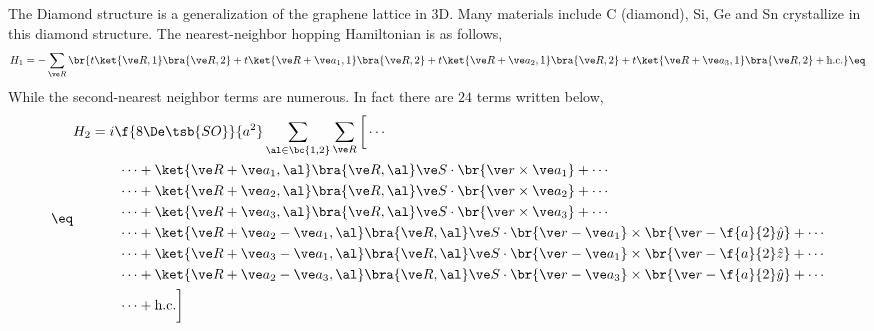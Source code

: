 \documentclass{article}
\begin{document}
The Diamond structure is a generalization of the graphene lattice in 3D. Many materials include C (diamond), Si, Ge and Sn crystallize in this diamond structure. The nearest-neighbor hopping Hamiltonian is as follows,
\[ H_1 = - \sum_{\ve R} \br{t \ket{\ve R, 1}\bra{\ve R, 2} + t \ket{\ve R + \ve a_1, 1}\bra{\ve R, 2} + t \ket{\ve R + \ve a_2, 1}\bra{\ve R, 2} + t \ket{\ve R + \ve a_3, 1} \bra{\ve R, 2} + \text{h.c.}} \eq \label{eq:diamond_H1}\]
While the second-nearest neighbor terms are numerous. In fact there are $24$ terms written below,
\begin{align*}
\eq \label{eq:diamond_H2}
\begin{split}
H_2
&= i \f{8 \De\tsb{SO}}{a^2} \sum_{\al \in \bc{1,2}}\sum_{\ve R} \bigg[\cdots \\
&\qquad \cdots + \ket{\ve R + \ve a_1,\al} \bra{\ve R, \al} \ve S \cdot \br{\ve r \times \ve a_1} + \cdots \\
&\qquad \cdots + \ket{\ve R + \ve a_2,\al} \bra{\ve R, \al} \ve S \cdot \br{\ve r \times \ve a_2} + \cdots \\
&\qquad \cdots + \ket{\ve R + \ve a_3,\al} \bra{\ve R, \al} \ve S \cdot \br{\ve r \times \ve a_3} + \cdots \\
&\qquad \cdots + \ket{\ve R + \ve a_2 - \ve a_1,\al} \bra{\ve R, \al} \ve S \cdot \br{\ve r - \ve a_1} \times \br{\ve r -\f{a}{2} \hat y} + \cdots \\
&\qquad \cdots + \ket{\ve R + \ve a_3 - \ve a_1,\al} \bra{\ve R, \al} \ve S \cdot \br{\ve r - \ve a_1} \times \br{\ve r -\f{a}{2} \hat z} + \cdots \\
&\qquad \cdots + \ket{\ve R + \ve a_2 - \ve a_3,\al} \bra{\ve R, \al} \ve S \cdot \br{\ve r - \ve a_3} \times \br{\ve r -\f{a}{2} \hat y} + \cdots \\
&\qquad \cdots + \text{h.c.} \bigg]
\end{split}
\end{align*}
\end{document}

